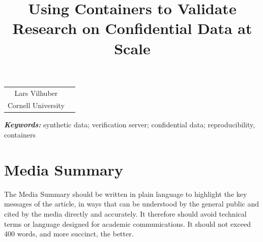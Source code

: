 \documentclass[]{hdsr}
\begin{document}




\begin{center}

  \title{Using Containers to Validate Research on Confidential Data at Scale}
  \maketitle

  \thispagestyle{empty}
  
  \vspace*{.2in}

  \begin{tabular}{cc}
    Lars Vilhuber\upstairs{\affilone,*}
   \\[0.25ex]
   {\small \upstairs{\affilone} Cornell University} \\
  \end{tabular}
  
  \vspace*{0.4in}

\begin{abstract}

\end{abstract}
\end{center}

\vspace*{0.15in}
\hspace{10pt}
  \small	
  \textbf{\textit{Keywords: }} {synthetic data; verification server; confidential data; reproducibility, containers}
  
\copyrightnotice

\section*{Media Summary}
The Media Summary should be written in plain language to highlight the key messages of
the article, in ways that can be understood by the general public and cited by the media 
directly and accurately.  It therefore should avoid technical terms or language designed for
academic communications. It should not exceed 400 words, and more succinct, the better.
\end{document}
